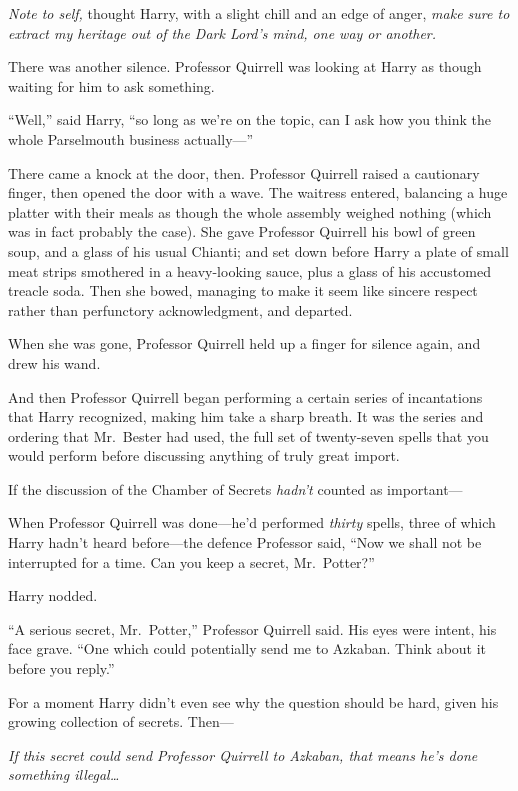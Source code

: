 \emph{Note to self,} thought Harry, with a slight chill and an edge of
anger, \emph{make sure to extract my heritage out of the Dark Lord's
mind, one way or another.}

There was another silence. Professor Quirrell was looking at Harry as
though waiting for him to ask something.

``Well,'' said Harry, ``so long as we're on the topic, can I ask how you
think the whole Parselmouth business actually---''

There came a knock at the door, then. Professor Quirrell raised a
cautionary finger, then opened the door with a wave. The waitress
entered, balancing a huge platter with their meals as though the whole
assembly weighed nothing (which was in fact probably the case). She gave
Professor Quirrell his bowl of green soup, and a glass of his usual
Chianti; and set down before Harry a plate of small meat strips
smothered in a heavy-looking sauce, plus a glass of his accustomed
treacle soda. Then she bowed, managing to make it seem like sincere
respect rather than perfunctory acknowledgment, and departed.

When she was gone, Professor Quirrell held up a finger for silence
again, and drew his wand.

And then Professor Quirrell began performing a certain series of
incantations that Harry recognized, making him take a sharp breath. It
was the series and ordering that Mr.~Bester had used, the full set of
twenty-seven spells that you would perform before discussing anything of
truly great import.

If the discussion of the Chamber of Secrets \emph{hadn't} counted as
important---

When Professor Quirrell was done---he'd performed \emph{thirty} spells,
three of which Harry hadn't heard before---the defence Professor said,
``Now we shall not be interrupted for a time. Can you keep a secret,
Mr.~Potter?''

Harry nodded.

``A serious secret, Mr.~Potter,'' Professor Quirrell said. His eyes were
intent, his face grave. ``One which could potentially send me to
Azkaban. Think about it before you reply.''

For a moment Harry didn't even see why the question should be hard,
given his growing collection of secrets. Then---

\emph{If this secret could send Professor Quirrell to Azkaban, that
means he's done something illegal\ldots{}}

